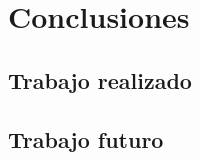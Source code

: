 
\chapter{Conclusiones} %

\label{Chapter5} %

\section{Trabajo realizado}

\section{Trabajo futuro}


